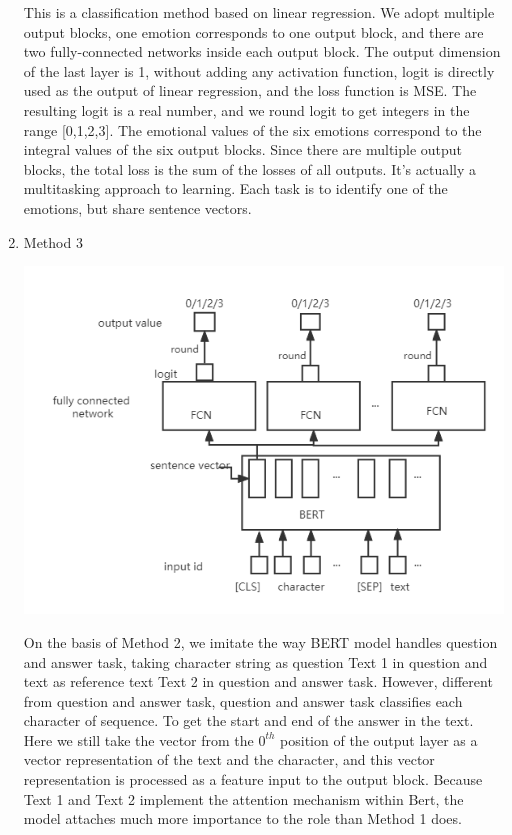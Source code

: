 \documentclass[12pt,twocolumn,letterpaper]{article}
\begin{document}
\begin{enumerate}
This is a classification method based on linear regression. We adopt multiple output blocks, one emotion corresponds to one output block, and there are two fully-connected networks inside each output block. The output dimension of the last layer is 1, without adding any activation function, logit is directly used as the output of linear regression, and the loss function is MSE.  The resulting logit is a real number, and we round logit to get integers in the range [0,1,2,3]. The emotional values of the six emotions correspond to the integral values of the six output blocks. Since there are multiple output blocks, the total loss is the sum of the losses of all outputs.  It's actually a multitasking approach to learning. Each task is to identify one of the emotions, but share sentence vectors. 

\item Method 3

\includegraphics[scale=0.5]{Method3.png}

 On the basis of Method 2, we imitate the way BERT model handles question and answer task, taking character string as question Text 1 in question and text as reference text Text 2 in question and answer task. However, different from question and answer task, question and answer task classifies each character of sequence. To get the start and end of the answer in the text. Here we still take the vector from the $0^{th}$ position of the output layer as a vector representation of the text and the character, and this vector representation is processed as a feature input to the output block. Because Text 1 and Text 2 implement the attention mechanism within Bert, the model attaches much more importance to the role than Method 1 does.  


\end{enumerate}
\end{document}
